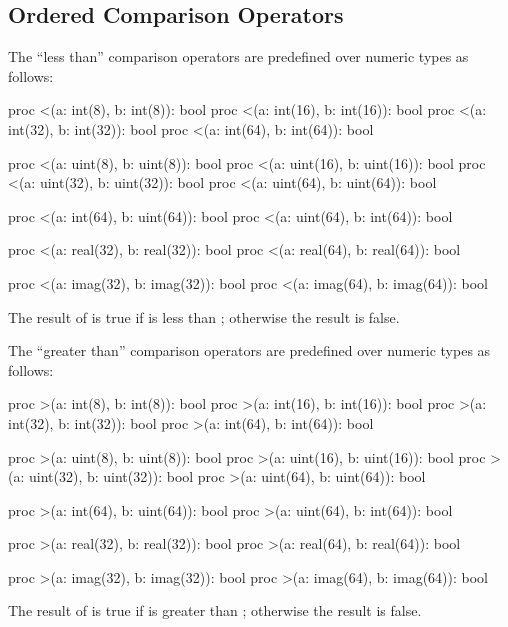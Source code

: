 \subsection{Ordered Comparison Operators}
\label{Ordered_Comparison_Operators}

The ``less than'' comparison operators are predefined over numeric
types as follows:
\begin{chapel}
proc <(a: int(8), b: int(8)): bool
proc <(a: int(16), b: int(16)): bool
proc <(a: int(32), b: int(32)): bool
proc <(a: int(64), b: int(64)): bool

proc <(a: uint(8), b: uint(8)): bool
proc <(a: uint(16), b: uint(16)): bool
proc <(a: uint(32), b: uint(32)): bool
proc <(a: uint(64), b: uint(64)): bool

proc <(a: int(64), b: uint(64)): bool
proc <(a: uint(64), b: int(64)): bool

proc <(a: real(32), b: real(32)): bool
proc <(a: real(64), b: real(64)): bool

proc <(a: imag(32), b: imag(32)): bool
proc <(a: imag(64), b: imag(64)): bool
\end{chapel}
The result of  is true if  is less than ;
otherwise the result is false.

The ``greater than'' comparison operators are predefined over numeric
types as follows:
\begin{chapel}
proc >(a: int(8), b: int(8)): bool
proc >(a: int(16), b: int(16)): bool
proc >(a: int(32), b: int(32)): bool
proc >(a: int(64), b: int(64)): bool

proc >(a: uint(8), b: uint(8)): bool
proc >(a: uint(16), b: uint(16)): bool
proc >(a: uint(32), b: uint(32)): bool
proc >(a: uint(64), b: uint(64)): bool

proc >(a: int(64), b: uint(64)): bool
proc >(a: uint(64), b: int(64)): bool

proc >(a: real(32), b: real(32)): bool
proc >(a: real(64), b: real(64)): bool

proc >(a: imag(32), b: imag(32)): bool
proc >(a: imag(64), b: imag(64)): bool
\end{chapel}
The result of  is true if  is greater
than ; otherwise the result is false.

